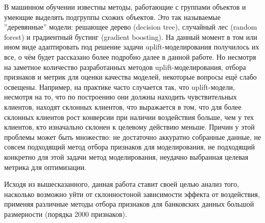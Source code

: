\par
В машинном обучении известны методы, работающие с группами объектов и умеющие выделять подгруппы схожих объектов. Это так называемые ''деревянные'' модели: решающее дерево (decision tree), случайный лес (random forest) и градиентный бустинг (gradient boosting). На данный момент в том или ином виде адаптировать под решение задачи uplift-моделирования получилось их все, о чём будет рассказано более подробно далее в данной работе. Но несмотря на заметное количество разработанных методов uplift-моделирования, отбора признаков и метрик для оценки качества моделей, некоторые вопросы ещё слабо освещены. Например, на практике часто случается так, что uplift-модели, несмотря на то, что по построению они должны находить чувствительных клиентов, находят склонных клиентов, что выражается в том, что для более склонных клиентов рост конверсии при наличии воздействия больше, чем у тех клиентов, кто изначально склонен к целевому действию меньше. Причин у этой проблемы может быть множество: не достаточно аккуратно собранные данные, не совсем подходящий метод отбора признаков для моделирования, не подходящий конкретно для этой задачи метод моделирования, неудачно выбранная целевая метрика для оптимизации.

\par
Исходя из вышесказанного, данная работа ставит своей целью анализ того, насколько возможно уйти от склонностоной зависимости эффекта от воздействия, применяя различные методы отбора признаков для банковских данных большой размерности (порядка 2000 признаков).



\iffalse


		анализ возможности ухода от склонностной зависимости предсказаний
								в аплифт моделях
		текущая тема норм
			отбор признаков = предмет исследования
			нужно исследовать и рост качества в зависимости от метода
			это и есть исследование -- вот это дало такое качество


данные -- идея отсекать моделью склонности слишком склонных и несклонных (из относительного аплифта -- как дальнейшие шаги и в экспериментах тоже)


их задачей по определению является, влияние отборов специализированные отборы признаков для uplift-моделирования и их влияние на качество финальных моделей. Также мало внимания 


\fi







